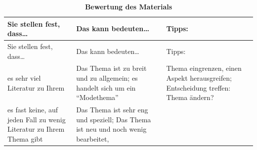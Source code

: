 \documentclass[]{book}
\theoremstyle{definition}
\theoremstyle{definition}
\theoremstyle{definition}
\theoremstyle{remark}
\begin{document}
\begin{longtable}[]{@{}lll@{}}
\caption{\textbf{\label{tab:bewerten} Bewertung des
Materials}}\tabularnewline
\toprule
\begin{minipage}[b]{0.31\columnwidth}\raggedright\strut
Sie stellen fest, dass\ldots{}\strut
\end{minipage} & \begin{minipage}[b]{0.30\columnwidth}\raggedright\strut
Das kann bedeuten\ldots{}\strut
\end{minipage} & \begin{minipage}[b]{0.30\columnwidth}\raggedright\strut
Tipps:\strut
\end{minipage}\tabularnewline
\midrule
\endfirsthead
\toprule
\begin{minipage}[b]{0.31\columnwidth}\raggedright\strut
Sie stellen fest, dass\ldots{}\strut
\end{minipage} & \begin{minipage}[b]{0.30\columnwidth}\raggedright\strut
Das kann bedeuten\ldots{}\strut
\end{minipage} & \begin{minipage}[b]{0.30\columnwidth}\raggedright\strut
Tipps:\strut
\end{minipage}\tabularnewline
\midrule
\endhead
\begin{minipage}[t]{0.31\columnwidth}\raggedright\strut
es sehr viel Literatur zu Ihrem\strut
\end{minipage} & \begin{minipage}[t]{0.30\columnwidth}\raggedright\strut
Das Thema ist zu breit und zu allgemein; es handelt sich um ein
``Modethema''\strut
\end{minipage} & \begin{minipage}[t]{0.30\columnwidth}\raggedright\strut
Thema eingrenzen, einen Aspekt herausgreifen; Entscheidung treffen:
Thema ändern?\vspace{5mm}\strut
\end{minipage}\tabularnewline
\begin{minipage}[t]{0.31\columnwidth}\raggedright\strut
es fast keine, auf jeden Fall zu wenig Literatur zu Ihrem Thema
gibt\strut
\end{minipage} & \begin{minipage}[t]{0.30\columnwidth}\raggedright\strut
Das Thema ist sehr eng und speziell; Das Thema ist neu und noch wenig
bearbeitet,\strut
\end{minipage} & \begin{minipage}[t]{0.30\columnwidth}\raggedright\strut

\end{minipage}
\end{longtable}
\end{document}

